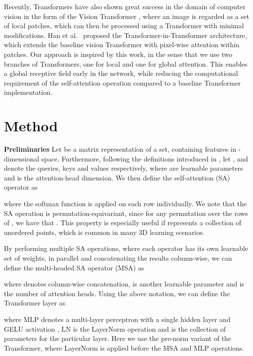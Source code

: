 \documentclass[a4paper,conference]{IEEEtran}
\begin{document}
Recently, Transformers have also shown great success in the domain of computer vision in the form of the Vision Transformer \cite{dosovitskiy2021image, touvron2021training}, where an image is regarded as a set of local patches, which can then be processed using a Transformer with minimal modifications. Han et al.\ \cite{han2021transformer} proposed the Transformer-in-Transformer architecture, which extends the baseline vision Transformer with pixel-wise attention within patches. Our approach is inspired by this work, in the sense that we use two branches of Transformers, one for local and one for global attention. This enables a global receptive field early in the network, while reducing the computational requirement of the self-attention operation compared to a baseline Transformer implementation.

\section{Method} \label{method}

\noindent \textbf{Preliminaries} Let  be a matrix representation of a set, containing  features in -dimensional space. Furthermore, following the definitions introduced in \cite{vaswani2017attention}, let ,  and  denote the queries, keys and values respectively, where  are learnable parameters and  is the attention-head dimension. We then define the self-attention (SA) operator as


where the softmax function is applied on each row individually. We note that the SA operation is permutation-equivariant, since for any permutation  over the rows of , we have that . This property is especially useful if  represents a collection of unordered points, which is common in many 3D learning scenarios.

By performing multiple SA operations, where each operator has its own learnable set of weights, in parallel and concatenating the results column-wise, we can define the multi-headed SA operator (MSA) as


where  denotes column-wise concatenation,  is another learnable parameter and  is the number of attention heads. Using the above notation, we can define the Transformer layer  as


where MLP denotes a multi-layer perceptron with a single hidden layer and GELU activation  \cite{hendrycks2016gaussian}, LN is the LayerNorm \cite{ba2016layer} operation and  is the collection of parameters for the particular layer. Here we use the pre-norm \cite{he2016deep} variant of the Transformer, where LayerNorm is applied before the MSA and MLP operations.
\end{document}
